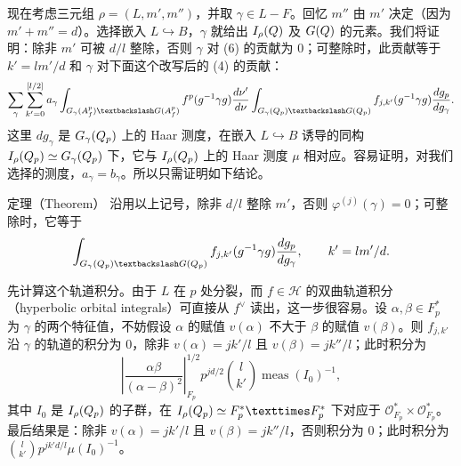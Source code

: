 现在考虑三元组 $\rho=(L,m',m'')$，并取 $\gamma\in L-F$。回忆 $m''$ 由 $m'$ 决定（因为 $m'+m''=d$）。选择嵌入 $L\hookrightarrow B$，$\gamma$ 就给出 $I_\rho(Q)$ 及 $G(Q)$ 的元素。我们将证明：除非 $m'$ 可被 $d/l$ 整除，否则 $\gamma$ 对 (6) 的贡献为 $0$；可整除时，此贡献等于 $k'=lm'/d$ 和 $\gamma$ 对下面这个改写后的 (4) 的贡献：
\[
\sum_\gamma\sum_{k'=0}^{[l/2]}a_\gamma
\int_{G_\gamma(\A_f^p)\backslash G(\A_f^p)}f^p(g^{-1}\gamma g)\frac{d\nu'}{d\nu}
\int_{G_\gamma(\Q_p)\backslash G(\Q_p)}f_{j,k'}(g^{-1}\gamma g)\frac{dg_p}{dg_\gamma}.
\]
这里 $dg_\gamma$ 是 $G_\gamma(Q_p)$ 上的 Haar 测度，在嵌入 $L\hookrightarrow B$ 诱导的同构
$I_\rho(Q_p)\simeq G_\gamma(Q_p)$ 下，它与 $I_\rho(Q_p)$ 上的 Haar 测度 $\mu$ 相对应。容易证明，对我们选择的测度，$a_\gamma=b_\gamma$。所以只需证明如下结论。

\begin{originaltheorem}{定理（Theorem）}
沿用以上记号，除非 $d/l$ 整除 $m'$，否则 $\varphi^{(j)}(\gamma)=0$；可整除时，它等于
\[
\int_{G_\gamma(\Q_p)\backslash G(\Q_p)}f_{j,k'}(g^{-1}\gamma g)\frac{dg_p}{dg_\gamma},
\qquad k'=lm'/d.
\]
\end{originaltheorem}

先计算这个轨道积分。由于 $L$ 在 $p$ 处分裂，而 $f\in\mathcal H$ 的双曲轨道积分（hyperbolic orbital integrals）可直接从 $f^\vee$ 读出，这一步很容易。设 $\alpha,\beta\in F_p^*$ 为 $\gamma$ 的两个特征值，不妨假设 $\alpha$ 的赋值 $v(\alpha)$ 不大于 $\beta$ 的赋值 $v(\beta)$。则 $f_{j,k'}$ 沿 $\gamma$ 的轨道的积分为 $0$，除非 $v(\alpha)=jk'/l$ 且 $v(\beta)=jk''/l$；此时积分为
\[
\left|\frac{\alpha\beta}{(\alpha-\beta)^2}\right|_{F_p}^{1/2}
p^{jd/2}\binom l{k'}\operatorname{meas}(I_0)^{-1},
\]
其中 $I_0$ 是 $I_\rho(Q_p)$ 的子群，在
$I_\rho(\Q_p)\simeq F_p^*\times F_p^*$ 下对应于
$\mathcal O_{F_p}^*\times\mathcal O_{F_p}^*$。最后结果是：除非
$v(\alpha)=jk'/l$ 且 $v(\beta)=jk''/l$，否则积分为 $0$；此时积分为
$\binom l{k'}p^{jk'd/l}\mu(I_0)^{-1}$。

